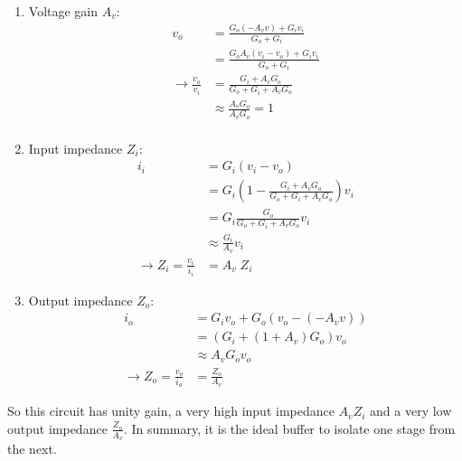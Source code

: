 \begin{enumerate}
	\item Voltage gain $A_v$:
	\begin{align*}
		v_o &= \frac{G_o (- A_v v) + G_i v_i}{G_o + G_i} \\
			&= \frac{G_o A_v (v_i - v_o) + G_i v_i}{G_o + G_i} \\
		\rightarrow \frac{v_o}{v_i} &= \frac{G_i + A_v G_o}{G_o + G_i +A_v G_o} \\
			&\approx \frac{A_v G_o}{A_v G_o} = 1\\
	\end{align*}
	\item Input impedance $Z_i$:
	\begin{align*}
		i_i &= G_i (v_i - v_o) \\
			&= G_i (1 - \frac{G_i + A_v G_o}{G_o + G_i +A_v G_o}) v_i \\
			&= G_i \frac{G_o}{G_o + G_i +A_v G_o} v_i \\
			&\approx \frac{G_i}{A_v} v_i \\
		\rightarrow Z_i = \frac{v_i}{i_i}&= A_v \; Z_i
	\end{align*}
	\item Output impedance $Z_o$:
	\begin{align*}
		i_o &= G_i v_o + G_o (v_o - (- A_v v)) \\
			&= ( G_i + (1 + A_v) G_o ) v_o \\
			&\approx A_v G_o v_o \\
		\rightarrow Z_o = \frac{v_o}{i_o} &= \frac{Z_o}{A_v}
	\end{align*}
\end{enumerate}
So this circuit has unity gain, a very high input impedance $A_v Z_i$ and a very low output impedance $\frac{Z_o}{A_v}$. In summary, it is the ideal buffer to isolate one stage from the next.\\

